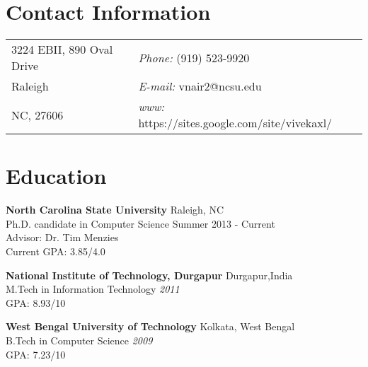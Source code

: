 \documentclass[margin,line]{res}
\begin{document}

\begin{resume}
\section{\sc Contact Information}
\vspace{.05in}
\begin{tabular}{@{}p{2in}p{4in}}
3224 EBII, 890 Oval Drive            & {\it Phone:}  (919) 523-9920 \\            
Raleigh   & {\it E-mail:}  vnair2@ncsu.edu\\         
NC, 27606 &  
  {\it www:} https://sites.google.com/site/vivekaxl/ \\
\end{tabular}



\section{\sc Education}
{\bf North Carolina State University } \hfill Raleigh, NC\\
\quad Ph.D. candidate in Computer Science  \hfill  Summer 2013 -  Current\\
Advisor: Dr. Tim Menzies\\
\quad Current GPA: 3.85/4.0 

{\bf National Institute of Technology, Durgapur } \hfill Durgapur,India \\
\quad M.Tech in Information Technology \hfill {\it 2011} \\
\quad GPA: 8.93/10


{\bf West Bengal University of Technology } \hfill Kolkata, West Bengal \\
\quad B.Tech in Computer Science \hfill {\it 2009} \\
\quad GPA: 7.23/10


\end{resume}
\end{document}
